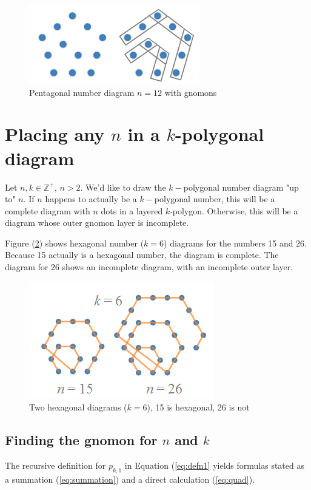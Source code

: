 \documentclass[notitlepage]{report}
\begin{document}
\begin{figure}[!htb]
    \centering
    \includegraphics[width=0.5\linewidth]{pentagon_with_gnomon.PNG}
    \caption{Pentagonal number diagram $n=12$ with gnomons}
    \label{fig:gnomons}
\end{figure}

\section*{Placing any $n$ in a $k$-polygonal diagram}

Let $n,k \in \mathbb{Z}^{+}$, $n > 2$. We'd like to draw the $k-$polygonal number diagram "up to" $n$. If $n$ happens to actually be a $k-$polygonal number, this will be a complete diagram with $n$ dots in a layered $k$-polygon. Otherwise, this will be a diagram whose outer gnomon layer is incomplete.

Figure (\ref{fig:hexagonals}) shows hexagonal number ($k = 6$) diagrams for the numbers 15 and 26. Because 15 actually is a hexagonal number, the diagram is complete. The diagram for 26 shows an incomplete diagram, with an incomplete outer layer.

\begin{figure}[!htb]
    \centering
    \includegraphics[width=0.5\linewidth]{hexagonal_and_no.PNG}
    \caption{Two hexagonal diagrams ($k = 6$), 15 is hexagonal, 26 is not}
    \label{fig:hexagonals}
\end{figure}


\subsection*{Finding the gnomon for $n$ and $k$}

The recursive definition for $p_{k,1}$ in Equation (\ref{eq:defn1} yields formulas stated as a summation (\ref{eq:summation}) and a direct calculation (\ref{eq:quad}).
\end{document}
